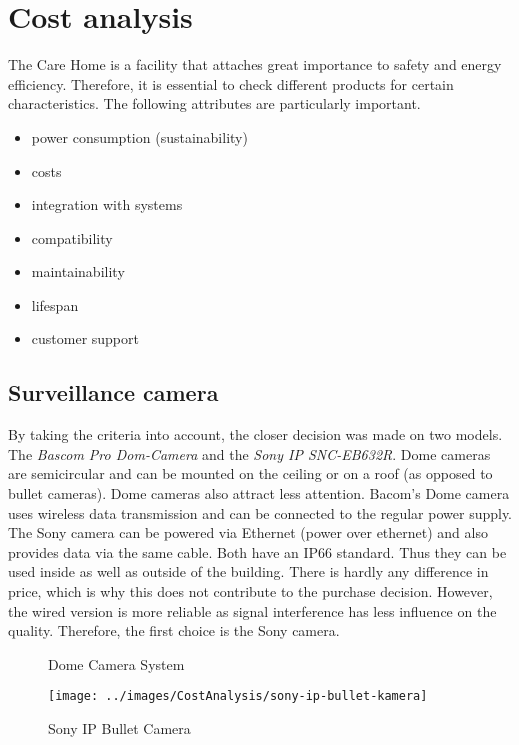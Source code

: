 \chapter{Cost analysis}
The Care Home is a facility that attaches great importance to safety and energy efficiency. Therefore, it is essential to check different products for certain characteristics. The following attributes are particularly important.
\begin{itemize}
	\item power consumption (sustainability)
	\item costs
	\item integration with systems
	\item compatibility
	\item maintainability
	\item lifespan
	\item customer support 
\end{itemize}

\section{Surveillance camera}
By taking the criteria into account, the closer decision was made on two models. The \textit{Bascom Pro Dom-Camera} and the \textit{Sony IP SNC-EB632R}. Dome cameras are semicircular and can be mounted on the ceiling or on a roof (as opposed to bullet cameras). Dome cameras also attract less attention. Bacom's Dome camera uses wireless data transmission and can be connected to the regular power supply. The Sony camera can be powered via Ethernet (power over ethernet) and also provides data via the same cable. Both have an IP66 standard. Thus they can be used inside as well as outside of the building. There is hardly any difference in price, which is why this does not contribute to the purchase decision. However, the wired version is more reliable as signal interference has less influence on the quality. Therefore, the first choice is the Sony camera.
\begin{figure}[h]%
	\centering 
	 \hspace{1cm}
	\caption{Dome Camera System}%
	\label{fig:domeCameraSystem}%
\end{figure}

\begin{figure}[h]
	\centering
	\texttt{[image: ../images/CostAnalysis/sony-ip-bullet-kamera]} 
	\caption{Sony IP Bullet Camera}
	\label{fig:sonyCamera}
\end{figure}

